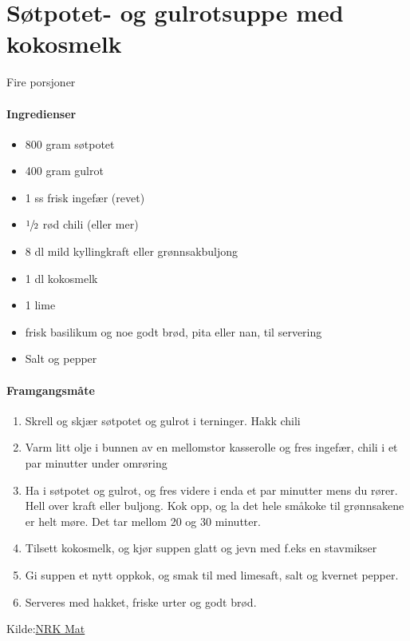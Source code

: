 \section{Søtpotet- og gulrotsuppe med kokosmelk}
\label{sotpotetSuppe}
Fire porsjoner\\

\paragraph{Ingredienser}
\begin{itemize}[noitemsep]
	    	\item 800 gram søtpotet
	    	\item 400 gram gulrot
	    	\item 1 ss frisk ingefær (revet)
	    	\item $\sfrac{1}{2}$ rød chili (eller mer)
	    	\item 8 dl mild kyllingkraft eller grønnsakbuljong
	    	\item 1 dl kokosmelk
	    	\item 1 lime
	    	\item frisk basilikum og noe godt brød, pita eller nan, til servering
			  \item Salt og pepper
\end{itemize}

\paragraph{Framgangsmåte}
\begin{enumerate}[noitemsep]
	\item Skrell og skjær søtpotet og gulrot i terninger. Hakk chili
	\item Varm litt olje i bunnen av en mellomstor kasserolle  og fres ingefær, chili i et par minutter under omrøring
	\item Ha i søtpotet og gulrot, og fres videre i enda et par minutter mens du rører. Hell over kraft eller buljong. Kok opp, og la det hele småkoke til grønnsakene er helt møre. Det tar mellom 20 og 30 minutter.
	\item Tilsett kokosmelk, og kjør suppen glatt og jevn med f.eks en stavmikser
	\item Gi suppen et nytt oppkok, og smak til med limesaft, salt og kvernet pepper.
	\item Serveres med hakket, friske urter og godt brød.
\end{enumerate}

Kilde:\href{https://www.nrk.no/mat/sotpotet--og-gulrotsuppe-med-kokosmelk-1.13146935}{NRK Mat}
